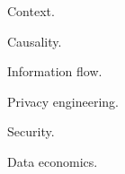 \documentclass[../thesis.tex]{subfiles}
\begin{document}
 Context.

 Causality.

 Information flow.

 Privacy engineering.

 Security.

 Data economics.
 
\end{document}
